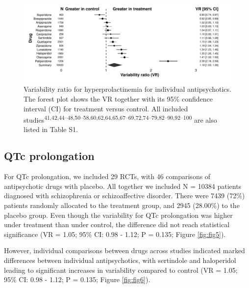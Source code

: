 \documentclass[9pt,english,,jou,floatsintext]{apa6}
\begin{document}
\begin{figure}
\centering
\includegraphics{../output/figures/prolactinsd_fig2.pdf}
\caption{\label{fig:fig4}Variability ratio for hyperprolactinemia for
individual antipsychotics. The forest plot shows the VR together with
its 95\% confidence interval (CI) for treatment versus control. All
included
studies\textsuperscript{41,42,44--48,50--58,60,62,64,65,67--69,72,74--79,82--90,92--100}
are also listed in Table S1.}
\end{figure}

\subsection{QTc prolongation}\label{qtc-prolongation}

For QTc prolongation, we included 29 RCTs, with 46 comparisons of
antipsychotic drugs with placebo. All together we included N = 10384
patients diagnosed with schizophrenia or schizoaffective disorder. There
were 7439 (72\%) patients randomly allocated to the treatment group, and
2945 (28.00\%) to the placebo group. Even though the variability for QTc
prolongation was higher under treatment than under control, the
difference did not reach statistical significance (VR = 1.05; 95\% CI:
0.98 - 1.12; P = 0.135; Figure \ref{fig:fig5}).

However, individual comparisons between drugs across studies indicated
marked differences between individual antipsychotics, with sertindole
and haloperidol leading to significant increases in variability compared
to control (VR = 1.05; 95\% CI: 0.98 - 1.12; P = 0.135; Figure
\ref{fig:fig6}).
\end{document}
